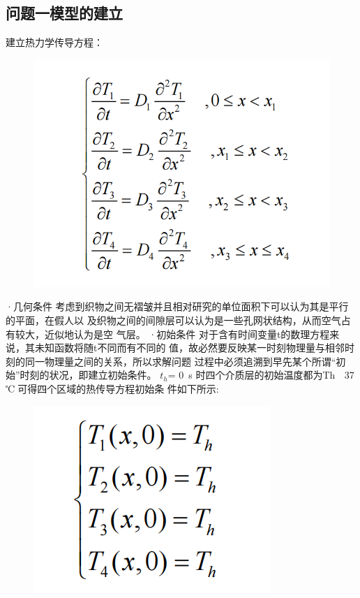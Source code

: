 \documentclass{article}
\begin{document}
	\subsection{问题一模型的建立}
	建立热力学传导方程：
	\begin{figure}[htbp]
		\centering
		\includegraphics[scale=0.4]{屏幕截图 2024-07-15 222721.png}
	\end{figure}
	
	·几何条件 
	考虑到织物之间无褶皱并且相对研究的单位面积下可以认为其是平行的平面，在假人以
	及织物之间的间隙层可以认为是一些孔网状结构，从而空气占有较大，近似地认为是空
	气层。 
	·初始条件 
	对于含有时间变量t的数理方程来说，其未知函数将随t不同而有不同的 
	值，故必然要反映某一时刻物理量与相邻时刻的同一物理量之间的关系，所以求解问题
	过程中必须追溯到早先某个所谓“初始”时刻的状况，即建立初始条件。 
	$t_{h}$= 0 s 时四个介质层的初始温度都为Th  37 ℃，可得四个区域的热传导方程初始条
	件如下所示:
	
	\begin{figure}[htbp]
		\centering
		\includegraphics[scale=0.4]{屏幕截图 2024-07-15 222907.png}
	\end{figure}
	
\end{document}
